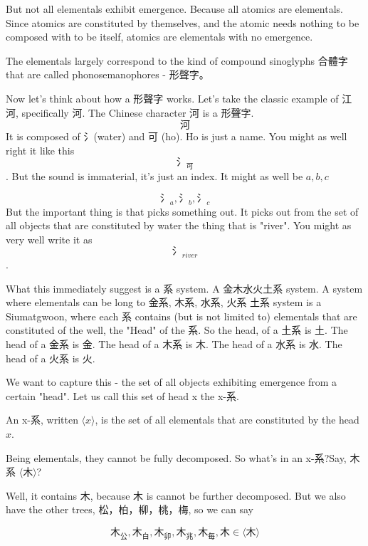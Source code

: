 But not all elementals exhibit emergence. Because all atomics are elementals. Since atomics are constituted by themselves, and the atomic needs nothing to be composed with to be itself, atomics are elementals with no emergence. 


The elementals largely correspond to the kind of compound sinoglyphs 合體字 that are called phonosemanophores - 形聲字。 

Now let's think about how a 形聲字 works. Let's take the classic example of 江河, specifically 河. The Chinese character 河 is a 形聲字. 
$$\text{河}$$
It is composed of 氵(water) and 可 (ho). Ho is just a name. You might as well right it like this $$\text{氵}_{\text{可}}$$. But the sound is immaterial, it's just an index. It might as well be $a,b,c$

$$\text{氵}_{a},\text{氵}_b,\text{氵}_c$$
But the important thing is that picks something out. It picks out from the set of all objects that are constituted by water the thing that is "river". You might as very well write it as $$\text{氵}_{river}$$. 

What this immediately suggest is a 系 system. A 金木水火土系 system. A system where elementals can be long to 金系, 木系, 水系, 火系 土系 system is a Siumatgwoon, where each 系 contains (but is not limited to) elementals that are constituted of the well, the "Head" of the 系. So the head, of a 土系 is 土. The head of a 金系 is 金. The head of a 木系 is 木. The head of a 水系 is 水. The head of a 火系 is 火. 

We want to capture this - the set of all objects exhibiting emergence from a certain "head". Let us call this set of head x the x-系. 


\begin{definition}[x-系]\label{def:x-system}
    An x-系, written $\langle x \rangle$, is the set of all elementals that are constituted by the head $x$.
\end{definition}

Being elementals, they cannot be fully decomposed. So what's in an x-系?Say, 木系 $\langle \text{木} \rangle$?

Well, it contains $\text{木}$, because $\text{木}$ is cannot be further decomposed. But we also have the other trees, 松，柏，柳，桃，梅, so we can say 

$$\text{木}_{\text{公}},\text{木}_{\text{白}},\text{木}_{\text{卯}},\text{木}_{\text{兆}},\text{木}_{\text{每}},  \text{木} \in \langle \text{木} \rangle$$



